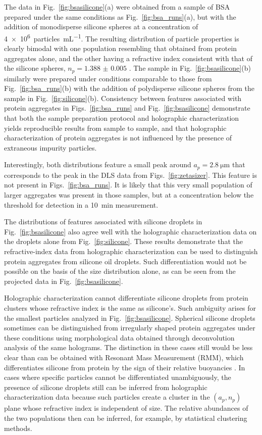 The data in Fig.~\ref{fig:bsasilicone}(a) were obtained from a
sample of BSA prepared under the same conditions as
Fig.~\ref{fig:bsa_runs}(a), but with the addition of monodisperse
silicone spheres at a concentration of \SI{4e6}{particles\per\mL}.
The resulting distribution of particle properties is clearly bimodal
with one population resembling that obtained from 
protein aggregates alone, and the other having a refractive index
consistent with that of the silicone spheres, $n_p = \num{1.388(5)}$
\cite{wang15a}. The sample in Fig.~\ref{fig:bsasilicone}(b) similarly were prepared under conditions comparable to those from Fig.~\ref{fig:bsa_runs}(b) with the addition of polydisperse silicone spheres from the sample in Fig.~\ref{fig:silicone}(b). 
Consistency between features associated with protein
aggregates in Figs.~\ref{fig:bsa_runs} and Fig.~\ref{fig:bsasilicone} demonstrate
that both the sample preparation protocol and holographic
characterization yields reproducible results from sample to sample,
and that holographic characterization of protein aggregates is not
influenced by the presence of extraneous impurity particles.

Interestingly, both distributions feature a small peak around $a_p = \SI{2.8}{\um}$ that corresponds to the peak in the DLS data from Figs.~\ref{fig:zetasizer}. This feature is not present in Figs.~\ref{fig:bsa_runs}. It is likely that this very small population of larger aggregates was present in those samples, but at a concentration  below the threshold for detection in a \SI{10}{\minute} measurement.

The distributions of features associated with silicone droplets in 
Fig.~\ref{fig:bsasilicone} also agree well with the holographic characterization data on the droplets alone from Fig.~\ref{fig:silicone}.
These results demonstrate that the refractive-index data from
holographic characterization can be used to distinguish protein
aggregates from silicone oil droplets.
Such differentiation would not be possible on the basis of the size
distribution alone, as can be seen from the projected data in
Fig.~\ref{fig:bsasilicone}.

Holographic characterization cannot differentiate silicone droplets from protein clusters whose refractive index is the same as silicone’s. Such ambiguity arises for the smallest particles analyzed in Fig.~\ref{fig:bsasilicone}. Spherical silicone droplets sometimes can be distinguished from irregularly shaped protein aggregates under these conditions using morphological data obtained through deconvolution analysis of the same holograms. The distinction in these cases still would be less clear than can be obtained with Resonant Mass Measurement (RMM), which differentiates silicone from protein by the sign of their relative buoyancies \cite{weinbuch13}. In cases where specific particles cannot be differentiated unambiguously, the presence of silicone droplets still can be inferred from holographic characterization data because such particles create a cluster in the 
$(a_p,n_p)$ plane whose refractive index is independent of size. The relative abundances of the two populations then can be inferred, for example, by statistical clustering methods.

